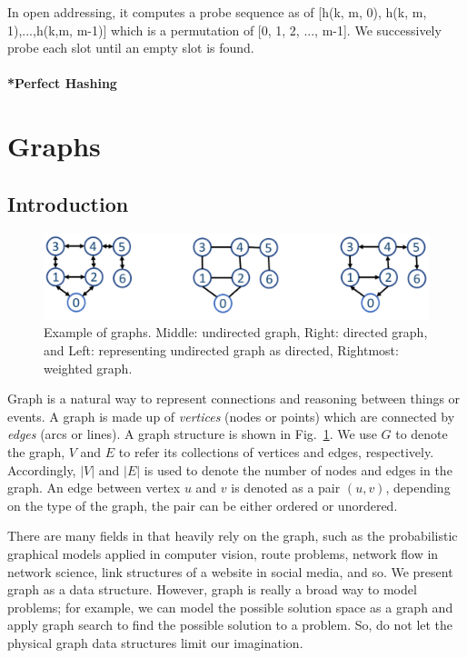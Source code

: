 \documentclass[../main.tex]{subfiles}
\begin{document}
In open addressing, it computes a probe sequence as of [h(k, m, 0), h(k, m, 1),...,h(k,m, m-1)] which is a permutation of [0, 1, 2, ..., m-1]. We successively probe each slot until an empty slot is found. 

\paragraph{*Perfect Hashing}
\section{Graphs}
\label{chapter_abstract_data_structure_graphs}
\subsection{Introduction}
\begin{figure}[!ht]
    \centering
        \includegraphics[width=\columnwidth]{fig/example_undirected_directed_graph.png}
    \caption{Example of graphs. Middle: undirected graph, Right: directed graph, and Left: representing undirected graph as directed, Rightmost: weighted graph.}
    \label{fig:graph_2}
\end{figure}
Graph is a natural way to represent connections and reasoning between things or events. A graph is made up of \textit{vertices} (nodes or points) which are connected by \textit{edges} (arcs or lines). A graph structure is shown in Fig.~\ref{fig:graph_2}.  We use $G$ to denote the graph, $V$ and $E$ to refer its collections of vertices and edges, respectively. Accordingly, $|V|$ and $|E|$ is used to denote the number of nodes and edges in the graph.  An edge between vertex $u$ and $v$ is denoted as a pair $(u, v)$, depending on the type of the graph, the pair can be either ordered or unordered. 

There are many fields in that heavily rely on the graph, such as the probabilistic graphical models applied in computer vision, route problems, network flow in network science, link structures of a website in social media, and so. We present graph as a data structure. However, graph is really a broad way to model problems; for example, we can model the possible solution space as a graph and apply graph search to find the possible solution to a problem.  So, do not let the physical graph data structures limit our imagination. 
\end{document}
